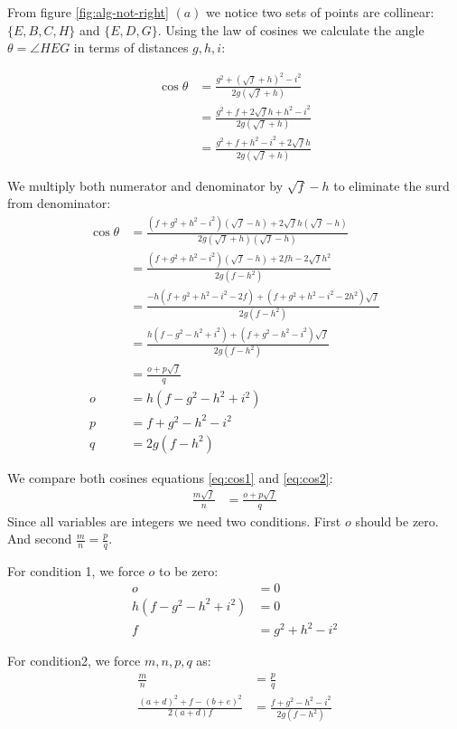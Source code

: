 \documentclass[11pt]{article}
\begin{document}
From figure \ref{fig:alg-not-right} $(a)$ we notice two sets of points are collinear:
$\{ E,B,C,H \}$ and $\{ E,D,G \}$. Using the law of cosines we calculate the 
angle $\theta = \angle{HEG}$ in terms of distances $g,h,i$:

\begin{align}
\cos\theta &= \frac{g^2 + (\sqrt{f}+h)^2 - i^2}{2g(\sqrt{f}+h)} \nonumber\\
 &= \frac{g^2 + f + 2\sqrt{f}h + h^2 - i^2}{2g(\sqrt{f}+h)} \nonumber\\
 &= \frac{g^2 + f + h^2 - i^2+ 2\sqrt{f}h}{2g(\sqrt{f}+h)}
\end{align}

We multiply both numerator and denominator by $\sqrt{f}-h$ to eliminate the surd from denominator:
\begin{align}
\cos\theta &= \frac{(f + g^2 + h^2 - i^2)(\sqrt{f}-h) + 2\sqrt{f}h(\sqrt{f}-h)}
	{2g(\sqrt{f}+h)(\sqrt{f}-h)} \nonumber\\
 &= \frac{(f + g^2 + h^2 - i^2)(\sqrt{f}-h) + 2fh - 2\sqrt{f}h^2}
	{2g(f-h^2)} \nonumber\\ 
 &= \frac{-h(f + g^2 + h^2 - i^2 - 2f) + (f + g^2 + h^2 - i^2 - 2h^2)\sqrt{f}}
	{2g(f-h^2)} \nonumber\\ 
 &= \frac{h(f - g^2 - h^2 + i^2) + (f + g^2 - h^2 - i^2)\sqrt{f}}
	{2g(f-h^2)} \nonumber\\ 
 &= \frac{o + p\sqrt{f}}{q} \label{eq:cos2}\\
o &= h(f - g^2 - h^2 + i^2) \\
p &= f + g^2 - h^2 - i^2 \\
q &= 2g(f-h^2)
\end{align}

We compare both cosines equations \ref{eq:cos1} and \ref{eq:cos2}:
\begin{align}
\frac{m\sqrt{f}}{n} &= \frac{o + p\sqrt{f}}{q}
\end{align}
Since all variables are integers we need two conditions. First $o$ should be zero.
And second $\frac{m}{n} = \frac{p}{q}$.

For condition 1, we force $o$ to be zero:
\begin{align}
o &= 0 \nonumber\\
h(f - g^2 - h^2 + i^2) & = 0 \nonumber\\
f &= g^2 + h^2 - i^2 \label{eq:condition1}
\end{align}

For condition2, we force $m,n,p,q$ as:
\begin{align}
\frac{m}{n} &= \frac{p}{q} \nonumber\\
\frac{(a+d)^2 + f - (b+e)^2}{2(a+d)f} &= \frac{f + g^2 - h^2 - i^2}{2g(f-h^2)} \nonumber\\
\end{align}
\end{document}
